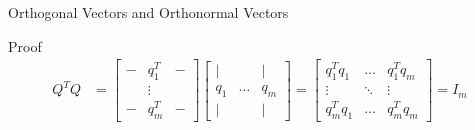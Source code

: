 \documentclass[aspectratio=169, UTF8]{ctexbeamer}
\begin{document}
\begin{frame}{Orthogonal Vectors and Orthonormal Vectors}
    \begin{block}{Proof}
        \begin{equation*}
            \begin{aligned}
                Q^{T} Q & =\left[\begin{array}{ccc}
                                         - & q_{1}^{T} & - \\
                                           & \vdots    &   \\
                                         - & q_{m}^{T} & -
                                     \end{array}\right]\left[\begin{array}{ccc}
                                                                 \mid  &        & \mid  \\
                                                                 q_{1} & \ldots & q_{m} \\
                                                                 \mid  &        & \mid
                                                             \end{array}\right]=\left[\begin{array}{ccc}
                                                                                          q_{1}^{T} q_{1} & \ldots & q_{1}^{T} q_{m} \\
                                                                                          \vdots          & \ddots & \vdots          \\
                                                                                          q_{m}^{T} q_{1} & \ldots & q_{m}^{T} q_{m}
                                                                                      \end{array}\right] =I_{m}
            \end{aligned}
        \end{equation*}
    \end{block}
\end{frame}
\end{document}

